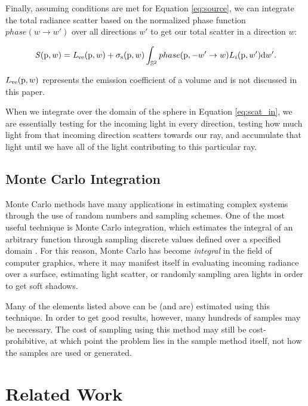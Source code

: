 \documentclass[12pt]{ucthesis}
\begin{document}
Finally, assuming conditions are met for Equation \ref{eq:source}, we can integrate the total radiance scatter based on the normalized phase function $phase(w \to w')$ over all directions $w'$ to get our total scatter in a direction $w$:

\begin{equation}
\mathit{S}(\textup{p},w) = \mathit{L}_{\textup{ve}}(\textup{p},w) + \sigma_{\textup{s}}(\textup{p}, w) \int_{\mathbb{S}^2} phase(\textup{p}, -w' \to w) L_{i}(\textup{p},w')\textup{d}w'.
\label{eq:scat_in}
\end{equation}

$L_{\textup{ve}}(\textup{p}, w)$ represents the emission coefficient of a volume and is not discussed in this paper.

When we integrate over the domain of the sphere in Equation \ref{eq:scat_in}, we are essentially testing for the incoming light in every direction, testing how much light from that incoming direction scatters towards our ray, and accumulate that light until we have all of the light contributing to this particular ray.


\section{Monte Carlo Integration}

Monte Carlo methods have many applications in estimating complex systems through the use of random numbers and sampling schemes.  One of the most useful technique is Monte Carlo integration, which estimates the integral of an arbitrary function through sampling discrete values defined over a specified domain \cite{aga}.  For this reason, Monte Carlo has become \textit{integral} in the field of computer graphics, where it may manifest itself in evaluating incoming radiance over a surface, estimating light scatter, or randomly sampling area lights in order to get soft shadows.

Many of the elements listed above can be (and are) estimated using this technique.  In order to get good results, however, many hundreds of samples may be necessary.  The cost of sampling using this method may still be cost-prohibitive, at which point the problem lies in the sample method itself, not how the samples are used or generated.

\chapter{Related Work}
\end{document}
